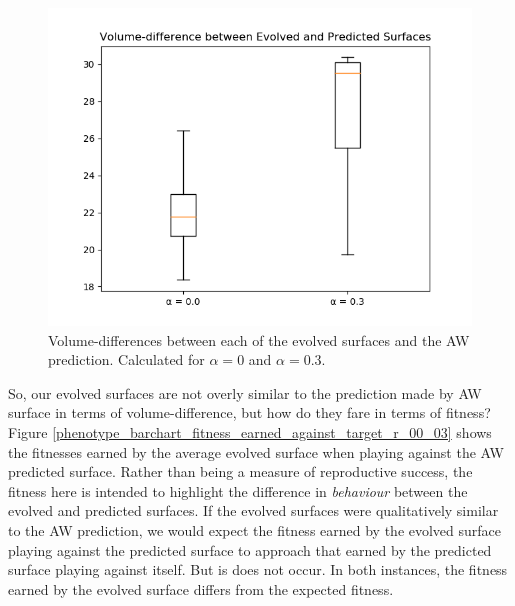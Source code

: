 \documentclass[11pt]{book}
\newcommand*{\np}{\par\noindent\newline}
\begin{document}
\begin{figure}
	\centering
	\includegraphics[scale=0.6]{resources/distance_boxplot_r_00_03.png}
	\caption{Volume-differences between each of the evolved surfaces and the AW prediction. Calculated for $\alpha = 0$ and $\alpha = 0.3$.}
	\label{boxplot_volume_difference_symmetric}
\end{figure}


\np So, our evolved surfaces are not overly similar to the prediction made by AW surface in terms of volume-difference, but how do they fare in terms of fitness?
Figure \ref{phenotype_barchart_fitness_earned_against_target_r_00_03} shows the fitnesses earned by the average evolved surface when playing against the AW predicted surface.
Rather than being a measure of reproductive success, the fitness here is intended to highlight the difference in \textit{behaviour} between the evolved and predicted surfaces.
If the evolved surfaces were qualitatively similar to the AW prediction, we would expect the fitness earned by the evolved surface playing against the predicted surface to approach that earned by the predicted surface playing against itself.
But is does not occur.
In both instances, the fitness earned by the evolved surface differs from the expected fitness.
\end{document}
